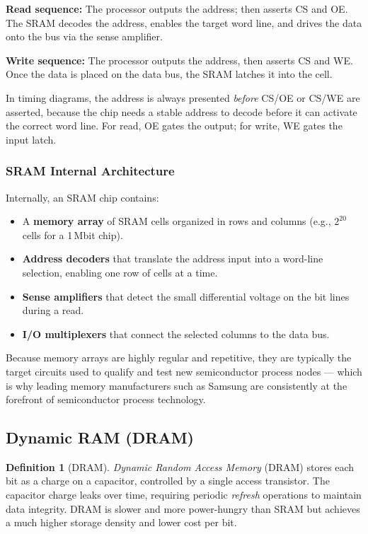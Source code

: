 \documentclass[11pt, a4paper, notitlepage]{report}
\theoremstyle{definition}
\newtheorem{definition}[theorem]{Definition}
\theoremstyle{remark}
\theoremstyle{definition}
\begin{document}
\textbf{Read sequence:} The processor outputs the address; then asserts CS and OE. The SRAM decodes the address, enables the target word line, and drives the data onto the bus via the sense amplifier.

\textbf{Write sequence:} The processor outputs the address, then asserts CS and WE. Once the data is placed on the data bus, the SRAM latches it into the cell.

\begin{examtip}[title={Exam Tip: SRAM Timing Signals}]
  In timing diagrams, the address is always presented \emph{before} CS/OE or CS/WE are asserted, because the chip needs a stable address to decode before it can activate the correct word line. For read, OE gates the output; for write, WE gates the input latch.
\end{examtip}

\subsubsection{SRAM Internal Architecture}

Internally, an SRAM chip contains:
\begin{itemize}
  \item A \textbf{memory array} of SRAM cells organized in rows and columns (e.g., $2^{20}$ cells for a 1\,Mbit chip).
  \item \textbf{Address decoders} that translate the address input into a word-line selection, enabling one row of cells at a time.
  \item \textbf{Sense amplifiers} that detect the small differential voltage on the bit lines during a read.
  \item \textbf{I/O multiplexers} that connect the selected columns to the data bus.
\end{itemize}

Because memory arrays are highly regular and repetitive, they are typically the target circuits used to qualify and test new semiconductor process nodes — which is why leading memory manufacturers such as Samsung are consistently at the forefront of semiconductor process technology.

\subsection{Dynamic RAM (DRAM)}
\label{sec:dram}

\begin{definition}[DRAM]
  \label{def:dram}
  \emph{Dynamic Random Access Memory} (DRAM) stores each bit as a charge on a capacitor, controlled by a single access transistor. The capacitor charge leaks over time, requiring periodic \emph{refresh} operations to maintain data integrity. DRAM is slower and more power-hungry than SRAM but achieves a much higher storage density and lower cost per bit.
\end{definition}
\end{document}
